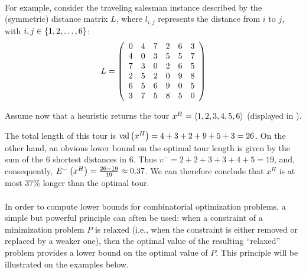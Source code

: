 \paragraph{}
\begin{example}
For example, consider the traveling salesman instance described by the (symmetric) distance matrix $L$, where $l_{i,j}$ represents the distance from $i$ to $j$, with $i,j\in\accl{1,2,\ldots,6}$:
\begin{equation}
L=\mtrx{cccccc}{
0&4&7&2&6&3\\
4&0&3&5&5&7\\
7&3&0&2&6&5\\
2&5&2&0&9&8\\
6&5&6&9&0&5\\
3&7&5&8&5&0
}
\end{equation}


Assume now that a heuristic returns the tour $x^H=\tupl{1,2,3,4,5,6}$ (displayed in ).


The total length of this tour is $\funm{val}{x^H}=4+3+2+9+5+3=26$. On the other hand, an obvious lower bound on the optimal tour length is given by the sum of the $6$ shortest distances in $6$. Thus $v^−=2+2+3+3+4+5=19$, and, consequently, $\fun{E^-}{x^H}=\tfrac{26-19}{19}\approx 0.37$. We can therefore conclude that $x^H$ is at most $37\%$ longer than the optimal tour.
\end{example}

\paragraph{}
In order to compute lower bounds for combinatorial optimization problems, a simple but powerful principle can often be used: when a constraint of a minimization problem $P$ is relaxed (i.e., when the constraint is either removed or replaced by a weaker one), then the optimal value of the resulting ``relaxed'' problem provides a lower bound on the optimal value of $P$. This principle will be illustrated on the examples below.
